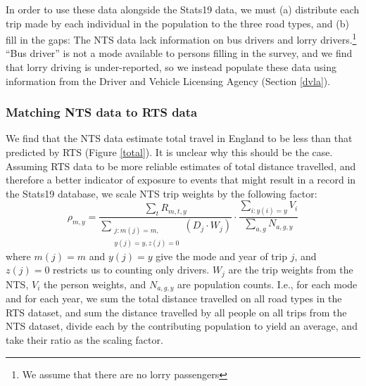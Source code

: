 \documentclass{article}
\begin{document}
In order to use these data alongside the Stats19 data, we must (a) distribute each trip made by each individual in the population to the three road types, and (b) fill in the gaps: The NTS data lack information on bus drivers and lorry drivers.\footnote{We assume that there are no lorry passengers} ``Bus driver'' is not a mode available to persons filling in the survey, and we find that lorry driving is under-reported, so we instead populate these data using information from the Driver and Vehicle Licensing Agency (Section \ref{dvla}).

\subsubsection{Matching NTS data to RTS data}\label{match}

We find that the NTS data estimate total travel in England to be less than that predicted by RTS (Figure \ref{total}). It is unclear why this should be the case. Assuming RTS data to be more reliable estimates of total distance travelled, and therefore a better indicator of exposure to events that might result in a record in the Stats19 database, we scale NTS trip weights by the following factor:
 $$\rho_{m,y}=\frac{\sum_{t}R_{m,t,y}}{\sum_{\substack{j:m(j)=m,\\
                  y(j)=y,z(j)=0}}\left(D_{j}\cdot W_{j}\right)}\cdot \frac{\sum_{i:y(i)=y}V_{i}}{\sum_{a,g}N_{a,g,y}}$$ 
where $m(j)=m$ and $y(j)=y$ give the mode and year of trip $j$, and $z(j)=0$ restricts us to counting only drivers. $W_j$ are the trip weights from the NTS, $V_i$ the person weights, and $N_{a,g,y}$ are population counts. I.e., for each mode and for each year, we sum the total distance travelled on all road types in the RTS dataset, and sum the distance travelled by all people on all trips from the NTS dataset, divide each by the contributing population to yield an average, and take their ratio as the scaling factor.
\end{document}
